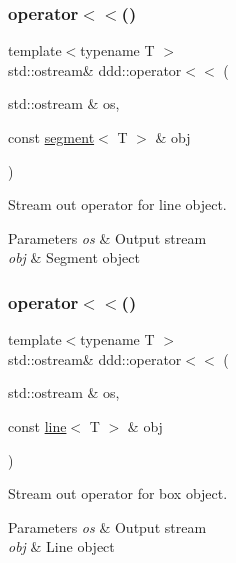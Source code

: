 \subsubsection{\texorpdfstring{operator$<$$<$()}{operator<<()}\hspace{0.1cm}{\footnotesize\ttfamily [3/10]}}
{\footnotesize\ttfamily template$<$typename T $>$ \\
std\+::ostream\& ddd\+::operator$<$$<$ (\begin{DoxyParamCaption}\item[{std\+::ostream \&}]{os,  }\item[{const \hyperlink{classddd_1_1segment}{segment}$<$ T $>$ \&}]{obj }\end{DoxyParamCaption})\hspace{0.3cm}{\ttfamily [inline]}}



Stream out operator for line object. 


\begin{DoxyParams}{Parameters}
{\em os} & Output stream \\
\hline
{\em obj} & Segment object \\
\hline
\end{DoxyParams}
\mbox{\label{namespaceddd_a2001eec5d960802592e1ca6a5b0dc203}} 
\subsubsection{\texorpdfstring{operator$<$$<$()}{operator<<()}\hspace{0.1cm}{\footnotesize\ttfamily [4/10]}}
{\footnotesize\ttfamily template$<$typename T $>$ \\
std\+::ostream\& ddd\+::operator$<$$<$ (\begin{DoxyParamCaption}\item[{std\+::ostream \&}]{os,  }\item[{const \hyperlink{classddd_1_1line}{line}$<$ T $>$ \&}]{obj }\end{DoxyParamCaption})\hspace{0.3cm}{\ttfamily [inline]}}



Stream out operator for box object. 


\begin{DoxyParams}{Parameters}
{\em os} & Output stream \\
\hline
{\em obj} & Line object \\
\hline
\end{DoxyParams}
\mbox{\label{namespaceddd_af710b0f11be50190553c743ce86545a3}} 
